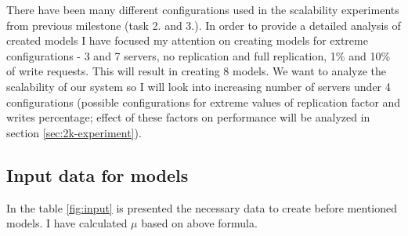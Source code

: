 \documentclass[11pt]{article}
\begin{document}

There have been many different configurations used in the scalability experiments from previous milestone (task 2. and 3.). In order to provide a detailed analysis of created models I have focused my attention on creating models for extreme configurations - 3 and 7 servers, no replication and full replication, 1\% and 10\% of write requests. This will result in creating 8 models. We want to analyze the scalability of our system so I will look into increasing number of servers under 4 configurations (possible configurations for extreme values of replication factor and writes percentage; effect of these factors on performance will be analyzed in section \ref{sec:2k-experiment}).

\subsection{Input data for models}

In the table \ref{fig:input} is presented the necessary data to create before mentioned models. I have calculated $\mu$ based on above formula.
\end{document}
